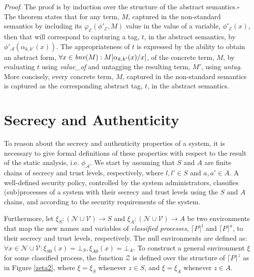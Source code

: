 \documentclass{entcs} \usepackage{entcsmacro}
\begin{document}
\noindent
{\itshape Proof\/}. The proof is by induction over the structure of the abstract semantics.\hfill$\square$\\


\noindent
The theorem states that for any term, $M$, captured in the non-standard semantics by including its $\varphi_\mathcal{E}(\phi'_\mathcal{E},M)$ value in the value of a variable, $\phi'_\mathcal{E}(x)$, then that will correspond to capturing a tag, $t$, in the abstract semantics, by $\phi'_\mathcal{A}(\alpha_{k,k'}(x))$.  The appropriateness of $t$ is expressed by the ability to obtain an abstract form, 
$\forall x\in\mbox{{\itshape bnv\/}}(M):M[\alpha_{k,k'}(x)/x]$, of the concrete term, $M$, by evaluating $t$ using {\itshape value\_of\/} and untagging the resulting term, $M'$, using {\itshape untag\/}.  More concisely, every concrete term, $M$, captured in the non-standard semantics is captured as the corresponding abstract tag, $t$, in the abstract semantics.
\section{Secrecy and Authenticity}
To reason about the secrecy and authenticity properties of a system, it is necessary to give formal definitions of these properties with respect to the result of the static analysis, i.e. $\phi_\mathcal{A}$.  We start by assuming that $S$ and $A$ are finite chains of secrecy and trust levels, respectively, where $l,l'\in S$ and $a,a'\in A$.  A well-defined security policy, controlled by the system administrators, classifies (sub)processes of a system with their secrecy and trust levels using the $S$ and $A$ chains, and according to the security requirements of the system.

Furthermore, let $\xi_S:(\mathcal{N}\cup\mathcal{V})\to S$ and $\xi_A:(\mathcal{N}\cup\mathcal{V})\to A$ be two environments that map the new names and variables of {\itshape classified processes\/}, $\lceil P\rceil^l$ and $\lceil P\rceil^a$, to their secrecy and trust levels, respectively. The null environments are defined as: $\forall x\in\mathcal{N}\cup\mathcal{V}:\xi_{S0}(x)=\bot_S,\xi_{A0}(x)=\bot_A$.  To construct a general environment $\xi$ for some classified process, the function $\mathcal{Z}$ is defined over the structure of $\lceil P\rceil^z$ as in Figure \ref{zeta2}, where $\xi=\xi_S$ whenever $z\in S$, and $\xi=\xi_A$ whenever $z\in A$.
\end{document}
